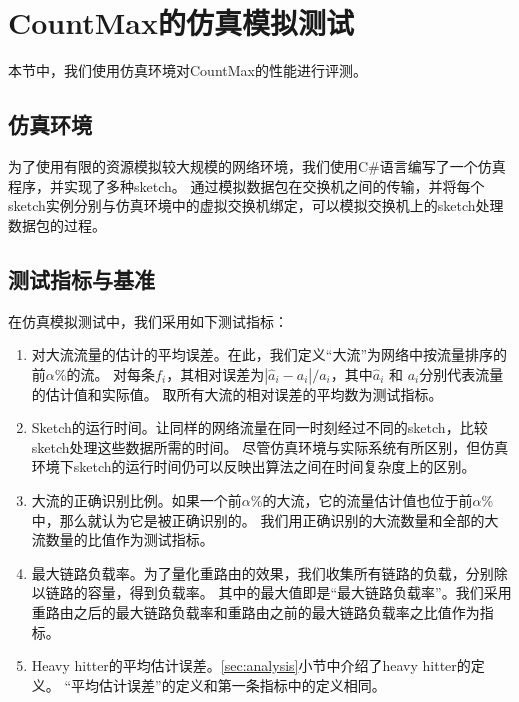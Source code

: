 \section{CountMax的仿真模拟测试}\label{sec:simulation}
本节中，我们使用仿真环境对CountMax的性能进行评测。

\subsection{仿真环境}
为了使用有限的资源模拟较大规模的网络环境，我们使用C\#语言编写了一个仿真程序，并实现了多种sketch。
通过模拟数据包在交换机之间的传输，并将每个sketch实例分别与仿真环境中的虚拟交换机绑定，可以模拟交换机上的sketch处理数据包的过程。


\subsection{测试指标与基准}\label{subsec:metric}
在仿真模拟测试中，我们采用如下测试指标：
\begin{enumerate}
	\item
    对大流流量的估计的平均误差。在此，我们定义“大流”为网络中按流量排序的前$\alpha$\%的流。
    对每条$f_i$，其相对误差为$|\hat{a}_i-a_i|/a_i$，其中$\hat{a}_i$ 和 $a_i$分别代表流量的估计值和实际值。
    取所有大流的相对误差的平均数为测试指标。
	\item
	Sketch的运行时间。让同样的网络流量在同一时刻经过不同的sketch，比较sketch处理这些数据所需的时间。
	尽管仿真环境与实际系统有所区别，但仿真环境下sketch的运行时间仍可以反映出算法之间在时间复杂度上的区别。
	\item
	大流的正确识别比例。如果一个前$\alpha$\%的大流，它的流量估计值也位于前$\alpha$\%中，那么就认为它是被正确识别的。
	我们用正确识别的大流数量和全部的大流数量的比值作为测试指标。
	\item
	最大链路负载率。为了量化重路由的效果，我们收集所有链路的负载，分别除以链路的容量，得到负载率。
	其中的最大值即是“最大链路负载率”。我们采用重路由之后的最大链路负载率和重路由之前的最大链路负载率之比值作为指标。
	\item
	Heavy hitter的平均估计误差。\ref{sec:analysis}小节中介绍了heavy hitter的定义。
	“平均估计误差”的定义和第一条指标中的定义相同。
\end{enumerate}

